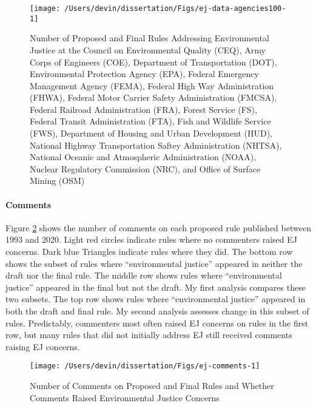 \documentclass[
      12pt,
        ]{article}
\begin{document}
\begin{figure}

{\centering \texttt{[image: /Users/devin/dissertation/Figs/ej-data-agencies100-1]} 

}

\caption{Number of Proposed and Final Rules Addressing Environmental Justice at the Council on Environmental Quality (CEQ), Army Corps of Engineers (COE), Department of Transportation (DOT), Environmental Protection Agency (EPA), Federal Emergency Management Agency (FEMA), Federal High Way Administration (FHWA), Federal Motor Carrier Safety Administration (FMCSA), Federal Railroad Administration (FRA), Forest Service (FS), Federal Transit Administration (FTA), Fish and Wildlife Service (FWS), Department of Housing and Urban Development (HUD), National Highway Transportation Saftey Administration (NHTSA), National Oceanic and Atmospheric Administration (NOAA), Nuclear Regulatory Commission (NRC), and Office of Surface Mining (OSM)}\label{fig:ej-data-agencies100}
\end{figure}

\hypertarget{comments}{%
\paragraph{Comments}\label{comments}}

Figure \ref{fig:ej-comments} shows the number of comments on each proposed rule published between 1993 and 2020. Light red circles indicate rules where no commenters raised EJ concerns. Dark blue Triangles indicate rules where they did. The bottom row shows the subset of rules where ``environmental justice'' appeared in neither the draft nor the final rule. The middle row shows rules where ``environmental justice'' appeared in the final but not the draft. My first analysis compares these two subsets. The top row shows rules where ``environmental justice'' appeared in both the draft and final rule. My second analysis assesses change in this subset of rules. Predictably, commenters most often raised EJ concerns on rules in the first row, but many rules that did not initially address EJ still received comments raising EJ concerns.

\begin{figure}

{\centering \texttt{[image: /Users/devin/dissertation/Figs/ej-comments-1]} 

}

\caption{Number of Comments on Proposed and Final Rules and Whether Comments Raised Environmental Justice Concerns}\label{fig:ej-comments}
\end{figure}
\end{document}
